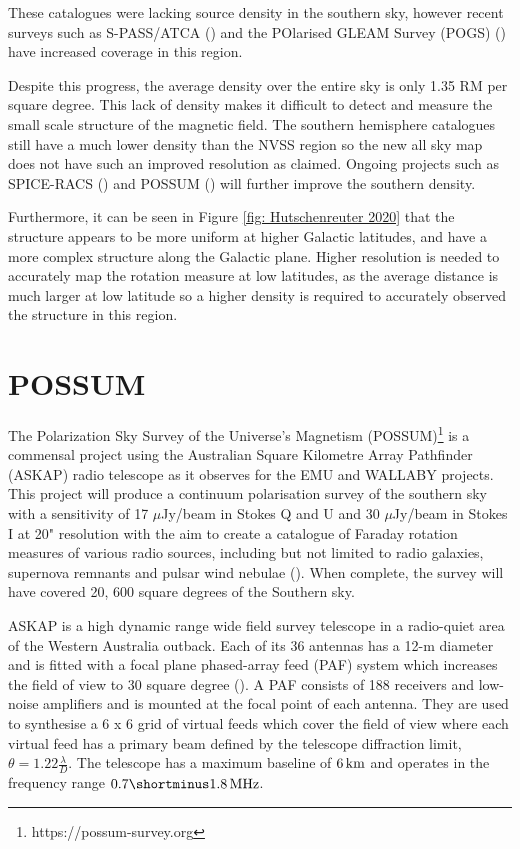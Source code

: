 These catalogues were lacking source density in the southern sky, however recent surveys such as S-PASS/ATCA (\cite{Schnitzeler_2019}) and the POlarised GLEAM Survey (POGS)
(\cite{POGS_2020}) have increased coverage in this region. 


Despite this progress, the average density over the entire sky is only 1.35 RM per square degree. This lack of density makes it difficult to detect and measure the small scale structure of the magnetic field. The southern hemisphere catalogues still have a much lower density than the NVSS region so the new all sky map does not have such an improved resolution as claimed. Ongoing projects such as SPICE-RACS (\cite{thomson2023rapidaskapcontinuumsurvey}) and POSSUM (\cite{POSSUM}) will further improve the southern density. 

Furthermore, it can be seen in Figure \ref{fig: Hutschenreuter 2020} that the structure appears to be more uniform at higher Galactic latitudes, and have a more complex structure along the Galactic plane. Higher resolution is needed to accurately map the rotation measure at low latitudes, as the average distance is much larger at low latitude so a higher density is required to accurately observed the structure in this region.  



\section{POSSUM}

The Polarization Sky Survey of the Universe's Magnetism (POSSUM)\footnote{https://possum-survey.org} is a commensal project using the Australian Square Kilometre Array Pathfinder (ASKAP) radio telescope as it observes for the EMU and WALLABY projects. This project will produce a continuum polarisation survey of the southern sky with a sensitivity of 17 $\mu$Jy/beam in Stokes Q and U and 30 $\mu$Jy/beam in Stokes I at 20" resolution with the aim to create a catalogue of Faraday rotation measures of various radio sources, including but not limited to radio galaxies, supernova remnants and pulsar wind nebulae (\cite{POSSUM}). When complete, the survey will have covered 20, 600 square degrees of the Southern sky.

ASKAP is a high dynamic range wide field survey telescope in a radio-quiet area of the Western Australia outback. Each of its 36 antennas has a 12-m diameter and is fitted with a focal plane phased-array feed (PAF) system which increases the field of view to 30 square degree (\cite{ASKAP}). A PAF consists of 188 receivers and low-noise amplifiers and is mounted at the focal point of each antenna. They are used to synthesise a 6 x 6 grid of virtual feeds which cover the field of view where each virtual feed has a primary beam defined by the telescope diffraction limit, $\theta = 1.22\frac{\lambda}{D}$. The telescope has a maximum baseline of $6\, {\rm km}$ and operates in the frequency range $0.7\shortminus1.8\, {\rm MHz}$.




